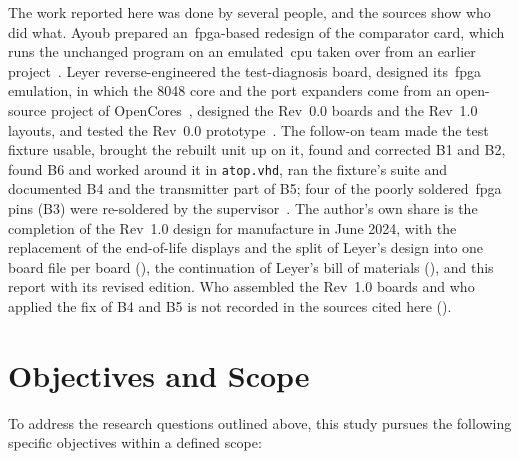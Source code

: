 The work reported here was done by several people, and the sources show who did what. Ayoub prepared an~\gls{fpga}-based redesign of the comparator card, which runs the unchanged program on an emulated~\gls{cpu} taken over from an earlier project~\cite[Sec.~2.3]{ayoub2014}. Leyer reverse-engineered the test-diagnosis board, designed its~\gls{fpga} emulation, in which the 8048 core and the port expanders come from an open-source project of OpenCores~\cite[Sec.~2.10]{leyer2023}, designed the Rev~0.0 boards and the Rev~1.0 layouts, and tested the Rev~0.0 prototype~\cite{leyer2023}. The follow-on team made the test fixture usable, brought the rebuilt unit up on it, found and corrected B1 and B2, found B6 and worked around it in \texttt{atop.vhd}, ran the fixture's suite and documented B4 and the transmitter part of B5; four of the poorly soldered~\gls{fpga} pins (B3) were re-soldered by the supervisor~\cite[pp.~10--21]{savchuk2025}. The author's own share is the completion of the Rev~1.0 design for manufacture in June 2024, with the replacement of the end-of-life displays and the split of Leyer's design into one board file per board (), the continuation of Leyer's bill of materials (), and this report with its revised edition. Who assembled the Rev~1.0 boards and who applied the fix of B4 and B5 is not recorded in the sources cited here ().

\section{Objectives and Scope}
\label{sec:objectives_scope}

To address the research questions outlined above, this study pursues the following specific objectives within a defined scope:

